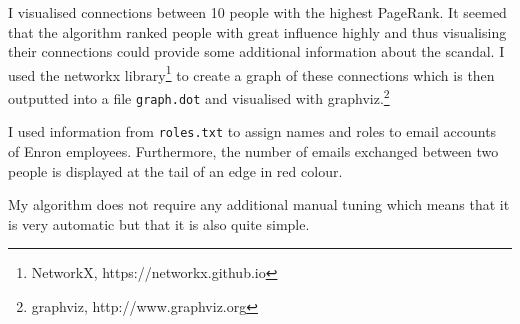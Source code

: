 \documentclass{tufte-handout}
\begin{document}
I visualised connections between 10 people with the highest PageRank. It
seemed that the algorithm ranked people with great influence highly and
thus visualising their connections could provide some additional
information about the scandal. I used the networkx library\footnote{NetworkX,
  https://networkx.github.io} to create a graph of these connections
which is then outputted into a file \texttt{graph.dot} and visualised
with graphviz.\footnote{graphviz, http://www.graphviz.org}

I used information from \texttt{roles.txt} to assign names and roles to
email accounts of Enron employees. Furthermore, the number of emails
exchanged between two people is displayed at the tail of an edge in red
colour.

My algorithm does not require any additional manual tuning which means
that it is very automatic but that it is also quite simple.
\end{document}
